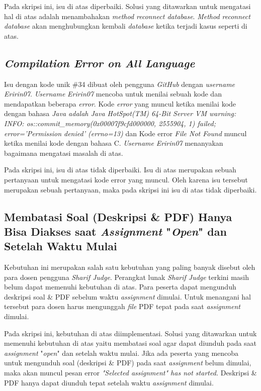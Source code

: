 Pada skripsi ini, isu di atas diperbaiki. Solusi yang ditawarkan untuk mengatasi hal di atas adalah menambahakan \textit{method reconnect database}. \textit{Method reconnect database} akan menghubungkan kembali \textit{database} ketika terjadi kasus seperti di atas.

\subsection{\textit{Compilation Error on All Language}}
Isu dengan kode unik \#34 dibuat oleh pengguna \textit{GitHub} dengan \textit{username} \textit{Eririn07}. \textit{Username} \textit{Eririn07} mencoba untuk menilai sebuah kode dan mendapatkan beberapa \textit{error}. Kode \textit{error} yang muncul ketika menilai kode dengan bahasa \textit{Java adalah Java HotSpot(TM) 64-Bit Server VM warning: INFO: os::commit\_memory(0x00007f9cfd000000, 2555904, 1) failed; error='Permission denied' (errno=13)} dan Kode error \textit{File Not Found} muncul ketika menilai kode dengan bahasa C. \textit{Username} \textit{Eririn07} menanyakan bagaimana mengatasi masalah di atas.

Pada skripsi ini, isu di atas tidak diperbaiki. Isu di atas merupakan sebuah pertanyaan untuk mengatasi kode error yang muncul. Oleh karena isu tersebut merupakan sebuah pertanyaan, maka pada skripsi ini isu di atas tidak diperbaiki.

\subsection{Membatasi Soal (Deskripsi \& PDF) Hanya Bisa Diakses saat \textit{Assignment} "\textit{Open}" dan Setelah Waktu Mulai}
\label{subsec:membatasisoal}
Kebutuhan ini merupakan salah satu kebutuhan yang paling banyak disebut oleh para dosen pengguna \textit{Sharif Judge}. Perangkat lunak \textit{Sharif Judge} terkini masih belum dapat memenuhi kebutuhan di atas. Para peserta dapat mengunduh deskripsi soal \& PDF sebelum waktu \textit{assignment} dimulai. Untuk menangani hal tersebut para dosen harus mengunggah \textit{file} PDF tepat pada saat \textit{assignment} dimulai. 

Pada skripsi ini, kebutuhan di atas diimplementasi. Solusi yang ditawarkan untuk memenuhi kebutuhan di atas yaitu membatasi soal agar dapat diunduh pada saat \textit{assignment} "\textit{open}" dan setelah waktu mulai. Jika ada peserta yang mencoba untuk mengunduh soal (deskripsi \& PDF) pada saat \textit{assignment} belum dimulai, maka akan muncul pesan error \textit{"Selected \textit{assignment"} has not started.} Deskripsi \& PDF hanya dapat diunduh tepat setelah waktu \textit{assignment} dimulai.

